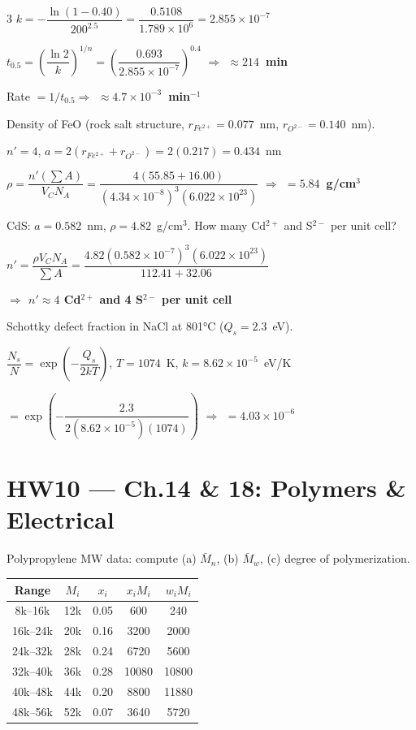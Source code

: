 \documentclass[8pt,letterpaper]{extarticle}
\newcommand{\prob}[1]{\smallskip\noindent{\footnotesize\bfseries\color{black!80} #1\quad}}
\newcommand{\soln}{\noindent{\footnotesize\itshape\color{blue!50!black}Sol: }}
\newcommand{\ans}[1]{{\footnotesize\bfseries\color{green!40!black}$\Rightarrow$ #1}}
\begin{document}
\begin{multicols*}{3}
$k = -\dfrac{\ln(1-0.40)}{200^{2.5}} = \dfrac{0.5108}{1.789\times10^6} = 2.855\times10^{-7}$

$t_{0.5} = \left(\dfrac{\ln 2}{k}\right)^{1/n} = \left(\dfrac{0.693}{2.855\times10^{-7}}\right)^{0.4}$ \ans{$\approx 214$~min}

Rate $= 1/t_{0.5}$\ans{$\approx 4.7\times10^{-3}$~min$^{-1}$}

\prob{12.16} Density of FeO (rock salt structure, $r_{Fe^{2+}}=0.077$~nm, $r_{O^{2-}}=0.140$~nm).

\soln $n'=4$, $a=2(r_{Fe^{2+}}+r_{O^{2-}})=2(0.217)=0.434$~nm

$\rho = \dfrac{n'(\sum A)}{V_C N_A} = \dfrac{4(55.85+16.00)}{(4.34\times10^{-8})^3(6.022\times10^{23})}$ \ans{$= 5.84$~g/cm$^3$}

\prob{12.18} CdS: $a=0.582$~nm, $\rho=4.82$~g/cm$^3$. How many Cd$^{2+}$ and S$^{2-}$ per unit cell?

\soln $n' = \dfrac{\rho V_C N_A}{\sum A} = \dfrac{4.82(0.582\times10^{-7})^3(6.022\times10^{23})}{112.41+32.06}$

\ans{$n'\approx4$ Cd$^{2+}$ and 4 S$^{2-}$ per unit cell}

\prob{12.29} Schottky defect fraction in NaCl at 801°C ($Q_s=2.3$~eV).

\soln $\dfrac{N_s}{N} = \exp\!\left(-\dfrac{Q_s}{2kT}\right)$, $T=1074$~K, $k=8.62\times10^{-5}$~eV/K

$= \exp\!\left(-\dfrac{2.3}{2(8.62\times10^{-5})(1074)}\right)$ \ans{$= 4.03\times10^{-6}$}

\section*{HW10 — Ch.14 \& 18: Polymers \& Electrical}

\prob{14.5} Polypropylene MW data: compute (a) $\bar{M}_n$, (b) $\bar{M}_w$, (c) degree of polymerization.

\begin{center}
\footnotesize
\begin{tabular}{@{}ccccc@{}}
\toprule
Range & $M_i$ & $x_i$ & $x_iM_i$ & $w_iM_i$\\
\midrule
8k--16k & 12k & 0.05 & 600 & 240\\
16k--24k & 20k & 0.16 & 3200 & 2000\\
24k--32k & 28k & 0.24 & 6720 & 5600\\
32k--40k & 36k & 0.28 & 10080 & 10800\\
40k--48k & 44k & 0.20 & 8800 & 11880\\
48k--56k & 52k & 0.07 & 3640 & 5720\\
\bottomrule
\end{tabular}
\end{center}


\end{multicols*}
\end{document}
